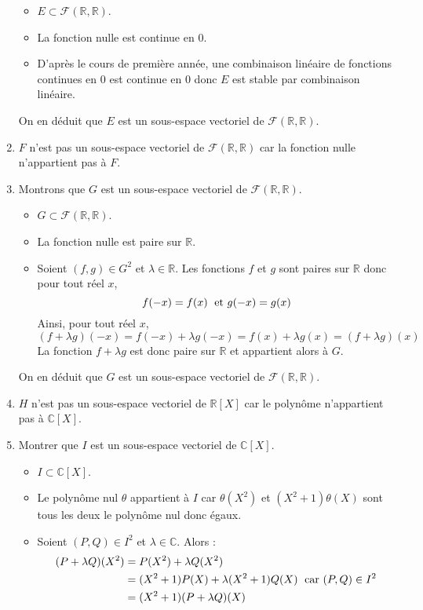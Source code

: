 \documentclass[a4paper,10pt]{report}
\begin{document}
\begin{enumerate}
\begin{itemize}
\item $E \subset \mathcal{F}(\mathbb{R}, \mathbb{R})$.
\item La fonction nulle est continue en $0$.
\item D'après le cours de première année, une combinaison linéaire de fonctions continues en $0$ est continue en $0$ donc $E$ est stable par combinaison linéaire.
\end{itemize}
On en déduit que $E$ est un sous-espace vectoriel de $\mathcal{F}(\mathbb{R}, \mathbb{R})$.
\item $F$ n'est pas un sous-espace vectoriel de $\mathcal{F}(\mathbb{R}, \mathbb{R})$ car la fonction nulle n'appartient pas à $F$.
\item Montrons que $G$ est un sous-espace vectoriel de $\mathcal{F}(\mathbb{R}, \mathbb{R})$.
\begin{itemize}
\item $G \subset \mathcal{F}(\mathbb{R}, \mathbb{R})$.
\item La fonction nulle est paire sur $\mathbb{R}$.
\item Soient $(f,g) \in G^2$ et $\lambda \in \mathbb{R}$. Les fonctions $f$ et $g$ sont paires sur $\mathbb{R}$ donc pour tout réel $x$,
$$ f(-x) = f(x) \; \hbox{ et } g(-x)=g(x)$$
Ainsi, pour tout réel $x$,
$$ (f+ \lambda g)(-x) = f(-x) + \lambda g(-x)= f(x) + \lambda g(x) = (f+ \lambda g)(x)$$
La fonction $f + \lambda g$ est donc paire sur $\mathbb{R}$ et appartient alors à $G$.
\end{itemize}
On en déduit que $G$ est un sous-espace vectoriel de $\mathcal{F}(\mathbb{R}, \mathbb{R})$.
\item $H$ n'est pas un sous-espace vectoriel de $\mathbb{R}[X]$ car le polynôme n'appartient pas à $\mathbb{C}[X]$.
\item Montrer que $I$ est un sous-espace vectoriel de $\mathbb{C}[X]$.
\begin{itemize}
\item $I \subset \mathbb{C}[X]$.
\item Le polynôme nul $\theta$ appartient à $I$ car $\theta(X^2)$ et $(X^2+1) \theta(X)$ sont tous les deux le polynôme nul donc égaux. 
\item Soient $(P,Q) \in I^2$ et $\lambda \in \mathbb{C}$. Alors :
\begin{align*}
(P + \lambda Q)(X^2)  & = P(X^2) + \lambda Q(X^2) \\
& = (X^2+1) P(X) + \lambda (X^2+1) Q(X) \; \hbox{ car } (P,Q) \in I^2 \\
& = (X^2+1)(P+\lambda Q)(X)

\end{align*}
\end{itemize}
\end{enumerate}
\end{document}
